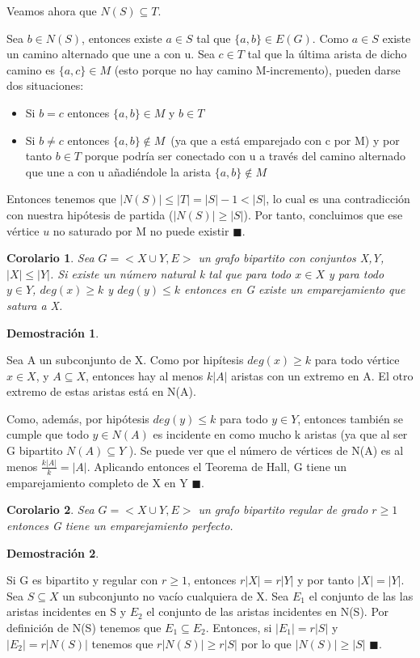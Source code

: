 \documentclass[a4paper,1pt]{report}
\newtheorem*{cor}{Corolario}
\newtheorem*{dem}{Demostración}
\begin{document}
Veamos ahora que $N(S)\subseteq  T$.

Sea $b\in N(S)$, entonces existe $a\in S$ tal que $\{a,b\}\in E(G)$. 
Como $a\in S$ existe un camino alternado que une a con u. Sea $c\in T$ tal que la última arista de dicho camino es $\{a,c\}\in M$ (esto porque no hay camino M-incremento), pueden darse dos situaciones:
\begin{itemize}
 \item Si $b=c$ entonces $\{a,b\}\in M$ y  $b\in T$
 \item Si $b\neq c$ entonces $\{a,b\}\not \in M$~(ya que a está emparejado con c por M) y por tanto $b\in T$ porque podría ser conectado con u a través del camino alternado que
une a con u añadiéndole la arista $\{a,b\}\not \in M$
\end{itemize}

Entonces tenemos que $|N(S)| \leq |T| = |S| - 1 < |S|$, lo cual es una contradicción con
nuestra hipótesis de partida ($|N(S)| \geq |S|$). Por tanto, concluimos que ese vértice $u$ no
saturado por M no puede existir $\blacksquare$.


\begin{cor}
 Sea $G=<X\cup Y, E>$ un grafo bipartito con conjuntos X,Y, $|X|\leq|Y|$. Si existe un número natural k tal que para todo $x\in X$ y para todo $y\in Y$, $deg(x)\geq k$ y $deg(y)\leq k$ entonces en G existe un emparejamiento que satura a X.
\end{cor}

\newpage

\begin{dem}
 
\end{dem}


Sea A un subconjunto de X. Como por hipítesis $deg(x)\geq k$ para todo vértice
$x \in X$, y $A \subseteq X$, entonces hay al menos $k|A|$ aristas con un extremo en A. 
El otro extremo de estas aristas está en N(A). 

Como, además, por hipótesis $deg(y) \leq k$ para todo $y \in Y $,
entonces también se cumple que todo $y \in N(A)$ es incidente en como mucho k aristas (ya
que al ser G bipartito $N(A) \subseteq Y$ ). Se puede ver que el número de vértices de N(A) es al menos $\frac{k|A|}{k} = |A|$. Aplicando entonces el Teorema de Hall, G tiene un emparejamiento completo de X en Y $\blacksquare$.

\begin{cor}
 Sea $G=<X\cup Y, E>$ un grafo bipartito regular de grado $r\geq 1$  entonces G
tiene un emparejamiento perfecto.
\end{cor}


\begin{dem}
 
\end{dem}


Si G es bipartito y regular con $r\geq 1$, entonces $r|X| = r|Y|$ y por tanto $|X|=|Y|$.
Sea $S \subseteq X$ un subconjunto no vacío cualquiera de X. Sea $E_1$ el conjunto de las
las aristas incidentes en S y $E_2$ el conjunto de las aristas incidentes en N(S). Por definición de N(S) tenemos que $E_1\subseteq E_2$. Entonces, si $|E_1|=r|S|$ y 
$|E_2|=r|N(S)|$ tenemos que $r|N(S)|\geq r|S|$ por lo que $|N(S)|\geq |S|$ $\blacksquare$.
\end{document}
